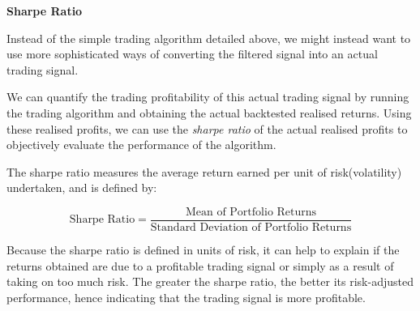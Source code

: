 \documentclass[../main.tex]{subfiles}
\begin{document}
\textbf{Sharpe Ratio}

Instead of the simple trading algorithm detailed above, we might instead want to use more sophisticated ways of  converting the filtered signal into an actual trading signal. 

We can quantify the trading profitability of this actual trading signal by running the trading algorithm and obtaining the actual backtested realised returns. Using these realised profits, we can use the \textit{sharpe ratio} of the actual realised profits to objectively evaluate the performance of the algorithm. 

The sharpe ratio measures the average return earned per unit of risk(volatility) undertaken, and is defined by: 

\begin{equation}
	\text{Sharpe Ratio} = \frac{\text{Mean of Portfolio Returns}}{\text{Standard Deviation of Portfolio Returns}}
\end{equation}

Because the sharpe ratio is defined in units of risk, it can help to explain if the returns obtained are due to a profitable trading signal or simply as a result of taking on too much risk. The greater the sharpe ratio, the better its risk-adjusted performance, hence indicating that the trading signal is more profitable. 
	
\end{document}
